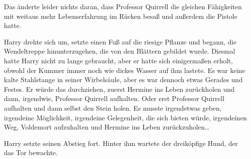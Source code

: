 Das änderte leider nichts daran, dass Professor Quirrell die gleichen Fähigkeiten mit weitaus mehr Lebenserfahrung im Rücken besaß und außerdem die Pistole hatte.

Harry drehte sich um, setzte einen Fuß auf die riesige Pflanze und begann, die Wendeltreppe hinunterzugehen, die von den Blättern gebildet wurde.
Diesmal hatte Harry nicht zu lange gebraucht, aber er hatte sich einigermaßen erholt, obwohl der Kummer immer noch wie dickes Wasser auf ihm lastete. Es war keine kalte Stahlstange in seiner Wirbelsäule, aber es war dennoch etwas Gerades und Festes. Er würde das durchziehen, zuerst Hermine ins Leben zurückholen und dann, irgendwie, Professor Quirrell aufhalten. Oder erst Professor Quirrell aufhalten und dann selbst den Stein holen. Es musste irgendetwas geben, irgendeine Möglichkeit, irgendeine Gelegenheit, die sich bieten würde, irgendeinen Weg, Voldemort aufzuhalten und Hermine ins Leben zurückzuholen…

Harry setzte seinen Abstieg fort.
Hinter ihm wartete der dreiköpfige Hund, der das Tor bewachte.

